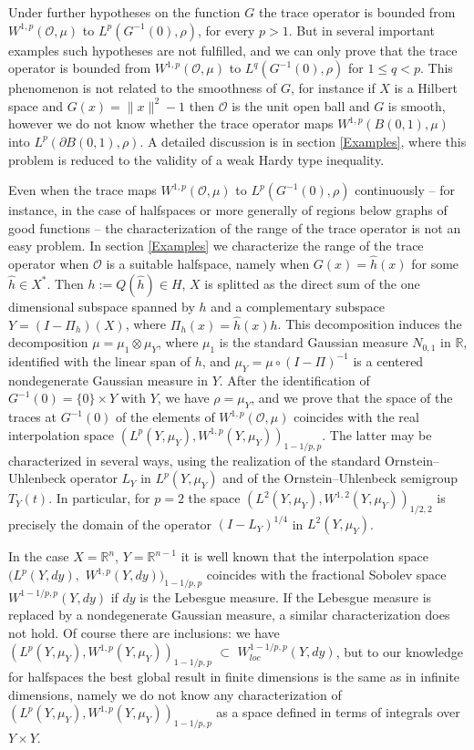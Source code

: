 \documentclass[reqno,twoside,12pt]{amsart}
\begin{document}
Under further hypotheses on the function $G$ the trace operator is bounded from $W^{1,p}({\mathcal O}, \mu)$ to $L^p(G^{-1}(0),  \rho)$, for every $p>1$. But in several important examples such hypotheses are not fulfilled, and we can only prove that the trace operator is bounded from $W^{1,p}({\mathcal O}, \mu)$ to $L^q(G^{-1}(0),  \rho)$ for $1\leq q<p$. This phenomenon is not related to the smoothness of $G$, for instance if $X$ is a Hilbert space and $G(x) = \|x\|^2-1$ then ${\mathcal O}$ is the unit open ball and $G$ is smooth, however we do not know whether the trace operator maps $W^{1,p}(B(0,1), \mu)$ into $L^p(\partial B(0,1),  \rho)$. A detailed discussion is in section \ref{Examples}, where this problem is reduced to the validity of a weak Hardy type inequality. 

Even when the trace maps $W^{1,p}({\mathcal O}, \mu)$ to $L^p(G^{-1}(0),  \rho)$ continuously -- for instance, in the case of halfspaces or more generally of regions below graphs of good functions -- the characterization of the range of the trace operator is not an easy problem.  
In section \ref{Examples} we characterize the range of the trace operator when ${\mathcal O}$ is a suitable halfspace, namely when $G(x) =   \hat{h}(x) $  for some $\hat{h}\in X^*$. Then $h := Q(\hat{h})\in H$, $X$ is splitted as the direct sum of the one dimensional subspace spanned by $h$ and a complementary subspace $Y= (I-\Pi_h)(X)$, where
$\Pi_h(x) = \hat{h}(x)h$. This  decomposition   induces the decomposition   $\mu = \mu_1 \otimes \mu_Y$, where $\mu_1 $ is the standard Gaussian measure $N_{0,1}$ in ${\mathbb R}$, identified with the linear  span of $h$, and  $\mu_Y= \mu \circ (I-\Pi )^{-1}$  is a centered nondegenerate Gaussian measure in $Y$. 
After the identification of  $G^{-1}(0)= \{0\} \times Y$ with $Y$, we have $ \rho= \mu_Y$, and we prove that the  space of the traces at $G^{-1}(0)$ of the elements of $W^{1,p}({\mathcal O}, \mu)$ coincides with the real interpolation space $(L^p(Y,  \mu_Y), W^{1,p}(Y,  \mu_Y))_{1-1/p, p}$. The latter may be characterized in several ways, using the realization of the standard Ornstein--Uhlenbeck operator $L_Y$ in $L^p(Y,  \mu_Y)$ and of the Ornstein--Uhlenbeck semigroup $T_Y(t)$. 
In particular, for $p=2$ the space $(L^2(Y,  \mu_Y), W^{1,2}(Y,  \mu_Y))_{1/2, 2}$ is precisely the domain of the operator $(I -L_Y)^{1/4}$ in $L^2(Y,  \mu_Y)$. 

In the case $X={\mathbb R}^n$, $Y= {\mathbb R}^{n-1}$ it is well known that the interpolation space  $(L^p(Y,dy), $ $W^{1,p}(Y, dy))_{1-1/p, p}$ coincides with the fractional Sobolev space $W^{1-1/p, p}(Y, dy)$ if $dy$ is the Lebesgue measure. If   the Lebesgue measure is replaced by a nondegenerate Gaussian measure, a similar characterization does not hold. Of course there are inclusions:  we have
$(L^p(Y,  \mu_Y), W^{1,p}(Y,  \mu_Y))_{1-1/p, p}$ $\subset$ $W^{1-1/p, p}_{loc}(Y, dy)$, but to our knowledge for halfspaces the best global result in finite dimensions is the same as in infinite dimensions, namely we do not know any characterization of $(L^p(Y,  \mu_Y), W^{1,p}(Y,  \mu_Y))_{1-1/p, p}$ as a space defined in terms of  integrals over $Y\times Y$. 
\end{document}
